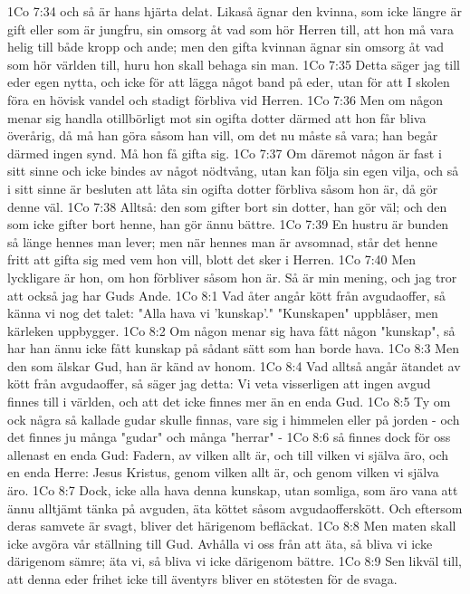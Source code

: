 1Co 7:34  och så är hans hjärta delat. Likaså ägnar den kvinna, som icke längre är gift eller som är jungfru, sin omsorg åt vad som hör Herren till, att hon må vara helig till både kropp och ande; men den gifta kvinnan ägnar sin omsorg åt vad som hör världen till, huru hon skall behaga sin man.
1Co 7:35  Detta säger jag till eder egen nytta, och icke för att lägga något band på eder, utan för att I skolen föra en hövisk vandel och stadigt förbliva vid Herren.
1Co 7:36  Men om någon menar sig handla otillbörligt mot sin ogifta dotter därmed att hon får bliva överårig, då må han göra såsom han vill, om det nu måste så vara; han begår därmed ingen synd. Må hon få gifta sig.
1Co 7:37  Om däremot någon är fast i sitt sinne och icke bindes av något nödtvång, utan kan följa sin egen vilja, och så i sitt sinne är besluten att låta sin ogifta dotter förbliva såsom hon är, då gör denne väl.
1Co 7:38  Alltså: den som gifter bort sin dotter, han gör väl; och den som icke gifter bort henne, han gör ännu bättre.
1Co 7:39  En hustru är bunden så länge hennes man lever; men när hennes man är avsomnad, står det henne fritt att gifta sig med vem hon vill, blott det sker i Herren.
1Co 7:40  Men lyckligare är hon, om hon förbliver såsom hon är. Så är min mening, och jag tror att också jag har Guds Ande.
1Co 8:1  Vad åter angår kött från avgudaoffer, så känna vi nog det talet: "Alla hava vi 'kunskap'." "Kunskapen" uppblåser, men kärleken uppbygger.
1Co 8:2  Om någon menar sig hava fått någon "kunskap", så har han ännu icke fått kunskap på sådant sätt som han borde hava.
1Co 8:3  Men den som älskar Gud, han är känd av honom.
1Co 8:4  Vad alltså angår ätandet av kött från avgudaoffer, så säger jag detta: Vi veta visserligen att ingen avgud finnes till i världen, och att det icke finnes mer än en enda Gud.
1Co 8:5  Ty om ock några så kallade gudar skulle finnas, vare sig i himmelen eller på jorden - och det finnes ju många "gudar" och många "herrar" -
1Co 8:6  så finnes dock för oss allenast en enda Gud: Fadern, av vilken allt är, och till vilken vi själva äro, och en enda Herre: Jesus Kristus, genom vilken allt är, och genom vilken vi själva äro.
1Co 8:7  Dock, icke alla hava denna kunskap, utan somliga, som äro vana att ännu alltjämt tänka på avguden, äta köttet såsom avgudaofferskött. Och eftersom deras samvete är svagt, bliver det härigenom befläckat.
1Co 8:8  Men maten skall icke avgöra vår ställning till Gud. Avhålla vi oss från att äta, så bliva vi icke därigenom sämre; äta vi, så bliva vi icke därigenom bättre.
1Co 8:9  Sen likväl till, att denna eder frihet icke till äventyrs bliver en stötesten för de svaga.

